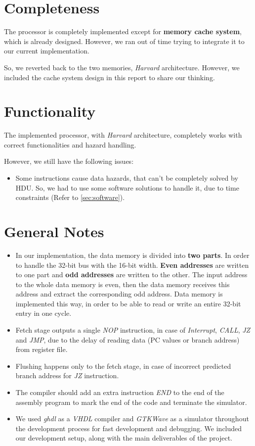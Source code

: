 \section{Completeness}
The processor is completely implemented except for \textbf{memory cache system}, which is already designed. However, we ran out of time trying to integrate it to our current implementation.

So, we reverted back to the two memories, \emph{Harvard} architecture. However, we included the cache system design in this report to share our thinking.

\section{Functionality}
The implemented processor, with \emph{Harvard} architecture, completely works with correct functionalities and hazard handling.

However, we still have the following issues:
\begin{itemize}
    \item Some instructions cause data hazards, that can't be completely solved by HDU. So, we had to use some software solutions to handle it, due to time constraints (Refer to \ref{sec:software}).
\end{itemize}

\section{General Notes}
\begin{itemize}
    \item In our implementation, the data memory is divided into \textbf{two parts}. In order to handle the 32-bit bus with the 16-bit width. \textbf{Even addresses} are written to one part and \textbf{odd addresses} are written to the other. The input address to the whole data memory is even, then the data memory receives this address and extract the corresponding odd address. Data memory is implemented this way, in order to be able to read or write an entire 32-bit entry in one cycle. 
    \item Fetch stage outputs a single \emph{NOP} instruction, in case of \emph{Interrupt}, \emph{CALL}, \emph{JZ} and \emph{JMP}, due to the delay of reading data (PC values or branch address) from register file.
    \item Flushing happens only to the fetch stage, in case of incorrect predicted branch address for \emph{JZ} instruction.
    \item The compiler should add an extra instruction \emph{END} to the end of the assembly program to mark the end of the code and terminate the simulator.
    \item We used \emph{ghdl} as a \emph{VHDL} compiler and \emph{GTKWave} as a simulator throughout the development process for fast development and debugging. We included our development setup, along with the main deliverables of the project. 
\end{itemize}